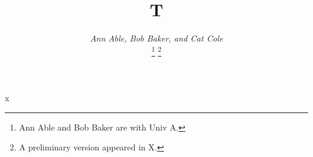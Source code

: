 \documentclass{IEEEtran}
\begin{document}
\title{T}
\author{\emph{Ann Able, Bob Baker, and Cat Cole}
\vspace{-9pt}

\vspace{-5pt}
\thanks{Ann Able and Bob Baker are with Univ A.}
\thanks{A preliminary version appeared in X.}}
\maketitle
x
\end{document}
